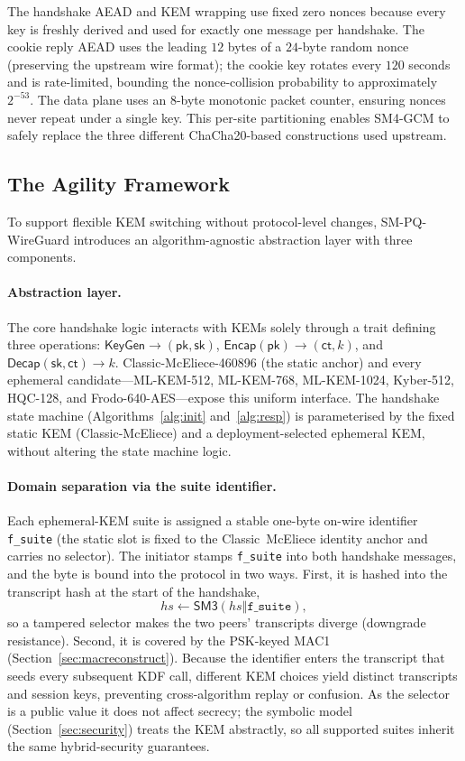 \documentclass{SCIS2026}
\newcommand{\concat}{\mathbin{\Vert}}
\newcommand{\Encap}{\mathsf{Encap}}
\newcommand{\Decap}{\mathsf{Decap}}
\newcommand{\KeyGen}{\mathsf{KeyGen}}
\begin{document}
The handshake AEAD and KEM wrapping use fixed zero nonces because
every key is freshly derived and used for exactly one message per
handshake.  The cookie reply AEAD uses the leading $12$ bytes of a
$24$-byte random nonce (preserving the upstream wire format); the
cookie key rotates every $120$ seconds and is rate-limited, bounding
the nonce-collision probability to approximately $2^{-53}$.  The
data plane uses an $8$-byte monotonic packet counter, ensuring
nonces never repeat under a single key.  This per-site partitioning
enables SM4-GCM to safely replace the three different
ChaCha20-based constructions used upstream.

\subsection{The Agility Framework}
\label{sec:agility}

To support flexible KEM switching without protocol-level changes,
SM-PQ-WireGuard introduces an algorithm-agnostic abstraction layer
with three components.

\paragraph{Abstraction layer.}
The core handshake logic interacts with KEMs solely through a trait
defining three operations: $\KeyGen \to (\textsf{pk}, \textsf{sk})$,
$\Encap(\textsf{pk}) \to (\textsf{ct}, k)$, and
$\Decap(\textsf{sk}, \textsf{ct}) \to k$.  Classic-McEliece-460896 (the
static anchor) and every ephemeral candidate---ML-KEM-512, ML-KEM-768,
ML-KEM-1024, Kyber-512, HQC-128, and Frodo-640-AES---expose this uniform
interface.  The handshake state machine (Algorithms~\ref{alg:init}
and~\ref{alg:resp}) is parameterised by the fixed static KEM
(Classic-McEliece) and a deployment-selected ephemeral KEM, without
altering the state machine logic.

\paragraph{Domain separation via the suite identifier.}
Each ephemeral-KEM suite is assigned a stable one-byte on-wire
identifier \texttt{f\_suite} (the static slot is fixed to the
Classic~McEliece identity anchor and carries no selector).  The
initiator stamps \texttt{f\_suite} into both handshake messages, and
the byte is bound into the protocol in two ways.  First, it is hashed
into the transcript hash at the start of the handshake,
\[
hs \gets \textsf{SM3}(hs \concat \texttt{f\_suite}),
\]
so a tampered selector makes the two peers' transcripts diverge
(downgrade resistance).  Second, it is covered by the PSK-keyed MAC1
(Section~\ref{sec:macreconstruct}).  Because the identifier enters the
transcript that seeds every subsequent KDF call, different KEM choices
yield distinct transcripts and session keys, preventing cross-algorithm
replay or confusion.  As the selector is a public value it does not
affect secrecy; the symbolic model (Section~\ref{sec:security}) treats
the KEM abstractly, so all supported suites inherit the same
hybrid-security guarantees.
\end{document}
